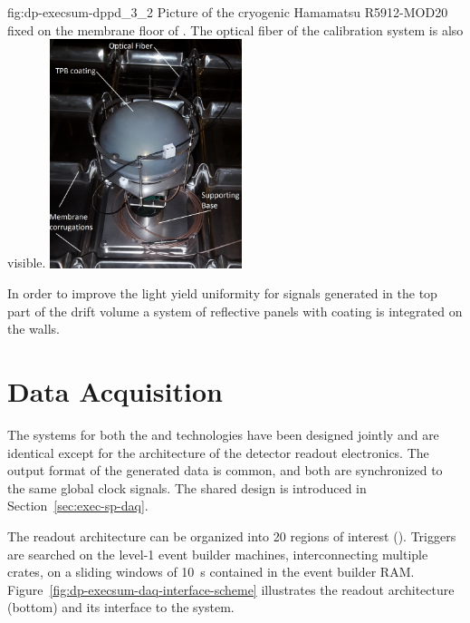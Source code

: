 \begin{dunefigure}{fig:dp-execsum-dppd_3_2}
{Picture of the cryogenic Hamamatsu R5912-MOD20  fixed on the membrane floor of . The optical fiber of the calibration system is also visible.}
\includegraphics[width=0.42\textwidth]{graphics/dp-execsum-pmt1}
\end{dunefigure}

In order to improve the light yield uniformity for signals generated in the top part of the drift volume a system of reflective panels with  coating is integrated on the   walls.


\section{Data Acquisition}
\label{sec:dp-execsum-daq}

The  systems for both the  and  technologies have been designed jointly and are identical except for the architecture of the detector readout electronics.  The output format of the generated data is common, and both are synchronized to the same global clock signals. The shared  design is introduced in Section~\ref{sec:exec-sp-daq}.

The  readout architecture can be organized into \num{20} regions of interest (). %
Triggers are searched on the level-1 event builder machines, interconnecting multiple  crates, on a sliding windows of \SI{10}{s} contained in the event builder RAM.
Figure~\ref{fig:dp-execsum-daq-interface-scheme} illustrates the  readout architecture (bottom) and its interface to the  system.
  
